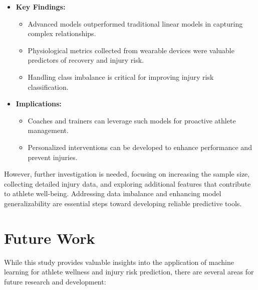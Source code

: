 \documentclass[manuscript,acmsmall,review,screen,authorversion=true]{acmart}
\begin{document}
\begin{itemize}
    \item \textbf{Key Findings:}

    \begin{itemize}
        \item Advanced models outperformed traditional linear models in capturing complex relationships.

        \item Physiological metrics collected from wearable devices were valuable predictors of recovery and injury risk.

        \item Handling class imbalance is critical for improving injury risk classification.
    \end{itemize}

    \item \textbf{Implications:}

    \begin{itemize}
        \item Coaches and trainers can leverage such models for proactive athlete management.

        \item Personalized interventions can be developed to enhance performance and prevent injuries.
    \end{itemize}
\end{itemize}

However, further investigation is needed, focusing on increasing the sample size, collecting detailed injury data, and exploring additional features that contribute to athlete well-being. Addressing data imbalance and enhancing model generalizability are essential steps toward developing reliable predictive tools.

\section{Future Work}

While this study provides valuable insights into the application of machine learning for athlete wellness and injury risk prediction, there are several areas for future research and development:
\end{document}
